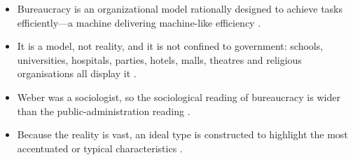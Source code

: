 \begin{QuickRevision}
\begin{itemize}
    \item Bureaucracy is an organizational model rationally designed to achieve tasks efficiently---a machine delivering machine-like efficiency .
    \item It is a model, not reality, and it is not confined to government: schools, universities, hospitals, parties, hotels, malls, theatres and religious organisations all display it .
    \item Weber was a sociologist, so the sociological reading of bureaucracy is wider than the public-administration reading .
    \item Because the reality is vast, an ideal type is constructed to highlight the most accentuated or typical characteristics .
\end{itemize}
\end{QuickRevision}

